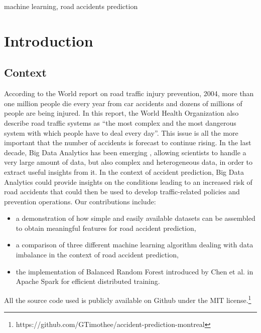 \documentclass[conference]{IEEEtran}
\begin{document}
\begin{IEEEkeywords}
machine learning, road accidents prediction
\end{IEEEkeywords}

\section{Introduction}
\subsection{Context}
According to the World report on road traffic injury prevention, 2004, more than one million people die every year from car accidents and dozens of millions of people are being injured\cite{Peden2004}. In this report, the World Health Organization also describe road traffic systems as “the most complex and the most dangerous system with which people have to deal every day”. This issue is all the more important that the number of accidents is forecast to continue rising. In the last decade, Big Data Analytics has been emerging \cite{Gandomi2015}, allowing scientists to handle a very large amount of data, but also complex and heterogeneous data, in order to extract useful insights from it. In the context of accident prediction, Big Data Analytics could provide insights on the conditions leading to an increased risk of road accidents that could then be used to develop traffic-related policies and prevention operations. Our contributions include: 
\begin{itemize}
\item a demonstration of how simple and easily available datasets can be assembled to obtain meaningful features for road accident prediction,
\item a comparison of three different machine learning algorithm dealing with data imbalance in the context of road accident prediction,
\item the implementation of Balanced Random Forest introduced by Chen et al. in Apache Spark for efficient distributed training. 
\end{itemize}
All the source code used is publicly available on Github under the MIT license.\footnote{https://github.com/GTimothee/accident-prediction-montreal}
\end{document}
